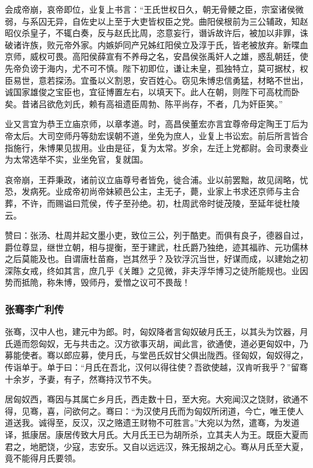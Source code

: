 \documentclass[]{article}
\begin{document}
会成帝崩，哀帝即位，业复上书言：``王氏世权日久，朝无骨鲠之臣，宗室诸侯微弱，与系囚无异，自佐史以上至于大吏皆权臣之党。曲阳侯根前为三公辅政，知赵昭仪杀皇子，不辄白奏，反与赵氏比周，恣意妄行，谮诉故许后，被加以非罪，诛破诸许族，败元帝外家。内嫉妒同产兄姊红阳侯立及淳于氏，皆老被放弃。新喋血京师，威权可畏。高阳侯薛宣有不养母之名，安昌侯张禹奸人之雄，惑乱朝廷，使先帝负谤于海内，尤不可不慎。陛下初即位，谦让未皇，孤独特立，莫可据杖，权臣易世，意若探汤。宜蚤以义割恩，安百姓心。窃见朱博忠信勇猛，材略不世出，诚国家雄俊之宝臣也，宜征博置左右，以填天下。此人在朝，则陛下可高枕而卧矣。昔诸吕欲危刘氏，赖有高祖遗臣周勃、陈平尚存，不者，几为奸臣笑。''

业又言宜为恭王立庙京师，以章孝道。时，高昌侯董宏亦言宜尊帝母定陶王丁后为帝太后。大司空师丹等劾宏误朝不道，坐免为庶人，业复上书讼宏。前后所言皆合指施行，朱博果见拔用。业由是征，复为太常。岁余，左迁上党都尉。会司隶奏业为太常选举不实，业坐免官，复就国。

哀帝崩，王莽秉政，诸前议立庙尊号者皆免，徙合浦。业以前罢黜，故见阔略，忧恐，发病死。业成帝初尚帝妹颍邑公主，主无子，薨，业家上书求还京师与主合葬，不许，而赐谥曰荒侯，传子至孙绝。初，杜周武帝时徙茂陵，至延年徙杜陵云。

赞曰：张汤、杜周并起文墨小吏，致位三公，列于酷吏。而俱有良子，德器自过，爵位尊显，继世立朝，相与提衡，至于建武，杜氏爵乃独绝，迹其福祚、元功儒林之后莫能及也。自谓唐杜苗裔，岂其然乎？及钦浮沉当世，好谋而成，以建始之初深陈女戒，终如其言，庶几乎《关雎》之见微，非夫浮华博习之徒所能规也。业因势而抵陒，称朱博，毁师丹，爱憎之议可不畏哉！

\hypertarget{header-n4726}{%
\subsubsection{张骞李广利传}\label{header-n4726}}

张骞，汉中人也，建元中为郎。时，匈奴降者言匈奴破月氏王，以其头为饮器，月氏遁而怨匈奴，无与共击之。汉方欲事灭胡，闻此言，欲通使，道必更匈奴中，乃募能使者。骞以郎应募，使月氏，与堂邑氏奴甘父俱出陇西。径匈奴，匈奴得之，传诣单于。单于曰：``月氏在吾北，汉何以得往使？吾欲使越，汉肯听我乎？''留骞十余岁，予妻，有子，然骞持汉节不失。

居匈奴西，骞因与其属亡乡月氏，西走数十日，至大宛。大宛闻汉之饶财，欲通不得，见骞，喜，问欲何之。骞曰：``为汉使月氏而为匈奴所闭道，今亡，唯王使人道送我。诚得至，反汉，汉之赂遗王财物不可胜言。''大宛以为然，遣骞，为发道译，抵康居。康居传致大月氏。大月氏王已为胡所杀，立其夫人为王。既臣大夏而君之，地肥饶，少寇，志安乐。又自以远远汉，殊无报胡之心。骞从月氏至大夏，竟不能得月氏要领。
\end{document}
